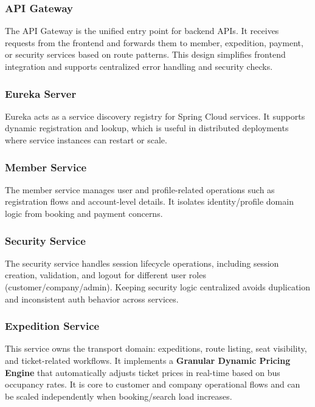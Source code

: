 \documentclass[12pt,a4paper]{article}
\begin{document}
\subsubsection{API Gateway}

The API Gateway is the unified entry point for backend APIs. It receives requests from the frontend and forwards them to member, expedition, payment, or security services based on route patterns. This design simplifies frontend integration and supports centralized error handling and security checks.

\subsubsection{Eureka Server}

Eureka acts as a service discovery registry for Spring Cloud services. It supports dynamic registration and lookup, which is useful in distributed deployments where service instances can restart or scale.

\subsubsection{Member Service}

The member service manages user and profile-related operations such as registration flows and account-level details. It isolates identity/profile domain logic from booking and payment concerns.

\subsubsection{Security Service}

The security service handles session lifecycle operations, including session creation, validation, and logout for different user roles (customer/company/admin). Keeping security logic centralized avoids duplication and inconsistent auth behavior across services.

\subsubsection{Expedition Service}

This service owns the transport domain: expeditions, route listing, seat visibility, and ticket-related workflows. It implements a \textbf{Granular Dynamic Pricing Engine} that automatically adjusts ticket prices in real-time based on bus occupancy rates. It is core to customer and company operational flows and can be scaled independently when booking/search load increases.
\end{document}
